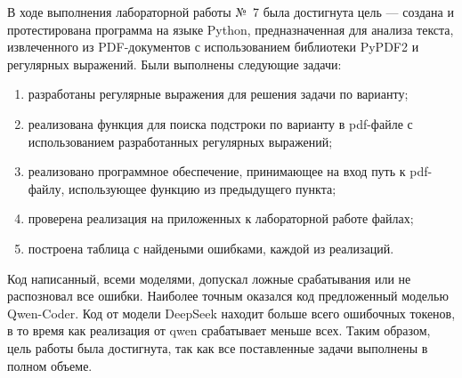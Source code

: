 
В ходе выполнения лабораторной работы №~7 была достигнута цель --- создана и протестирована программа на языке Python,
предназначенная для анализа текста, извлеченного из PDF-документов с использованием библиотеки PyPDF2 и регулярных выражений.
Были выполнены следующие задачи:
\begin{enumerate}
	\item разработаны регулярные выражения для решения задачи по варианту;
	\item реализована функция для поиска подстроки по варианту в pdf-файле с использованием разработанных регулярных выражений;
	\item реализовано программное обеспечение, принимающее на вход путь к pdf-файлу, использующее функцию из предыдущего пункта;
	\item проверена реализация на приложенных к лабораторной работе файлах;
	\item построена таблица с найдеными ошибками, каждой из реализаций.
\end{enumerate}

Код написанный, всеми моделями, допускал ложные срабатывания или не распозновал все ошибки. Наиболее точным оказался код предложенный моделью Qwen-Coder.
Код от модели DeepSeek находит больше всего ошибочных токенов, в то время как реализация от qwen срабатывает меньше всех. 
Таким образом, цель работы была достигнута, так как все поставленные задачи выполнены в полном объеме.